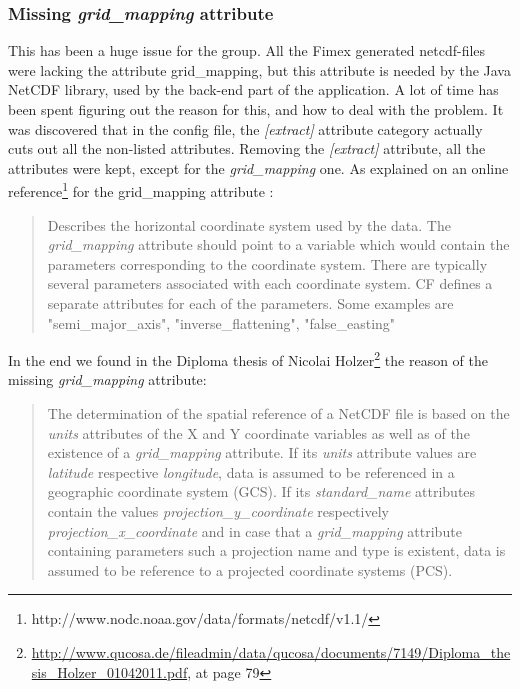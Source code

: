 \documentclass[11pt,a4paper,titlepage,oneside]{report}
\begin{document}
\subsubsection{Missing \textit{grid\_mapping} attribute}
\label{sec:ChallengeFimexMissingAttribute}
This has been a huge issue for the group. All the \gls{Fimex} generated \gls{netcdf}-files were lacking  the attribute grid\_mapping, but this attribute is needed by the Java NetCDF library, used by the \gls{back-end} part of the application. A lot of time has been spent figuring out the reason for this, and how to deal with the problem. 
It was discovered that in the config file, the \textit{[extract]} attribute category actually cuts out all the non-listed attributes. Removing the  \textit{[extract]} attribute, all the attributes were kept, except for the \textit{grid\_mapping} one.
As explained on an online reference\footnote{http://www.nodc.noaa.gov/data/formats/netcdf/v1.1/} for the grid\_mapping attribute :
\begin{quote}
Describes the horizontal coordinate system used by the data. The \textit{grid\_mapping} attribute should point to a variable which would contain the parameters corresponding to the coordinate system. There are typically several parameters associated with each coordinate system. CF defines a separate attributes for each of the parameters. Some examples are "semi\_major\_axis", "inverse\_flattening", "false\_easting"
\end{quote}

In the end we found in the Diploma thesis of Nicolai Holzer\footnote{\url{http://www.qucosa.de/fileadmin/data/qucosa/documents/7149/Diploma\_thesis\_Holzer\_01042011.pdf},  at page 79} the reason of the missing \textit{grid\_mapping} attribute:

\begin{quote}
The determination of the spatial reference of a NetCDF file is based on the \textit{units} attributes of the X and Y coordinate variables as well as of the existence of a \textit{grid\_mapping} attribute. If its \textit{units} attribute values are \textit{latitude} respective \textit{longitude}, data is assumed to be referenced in a geographic coordinate system (\gls{GCS}). If its \textit{standard\_name} attributes contain the values \textit{projection\_y\_coordinate} respectively \textit{projection\_x\_coordinate} and in case that a  \textit{grid\_mapping} attribute containing parameters such a projection name and type is existent, data is assumed to be reference to a projected coordinate systems (\gls{PCS}).
\end{quote}
\end{document}
